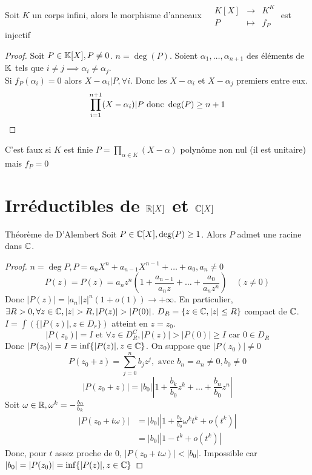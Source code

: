 \documentclass[]{report}
\begin{document}
    \begin{cor}{}{}
        Soit $K$ un corps infini, alors le morphisme d'anneaux $\begin{array}{ccccc}
    & K[X] & \to & K^K \\
    & P & \mapsto & f_P
    \end{array}$ est injectif
    \end{cor}

    \begin{proof}
        Soit $P\in\mathbb{K}[X],P\neq0$. $n=\deg(P)$. Soient $\alpha_1,\ldots,\alpha_{n+1}$ des éléments de $\mathbb{K}$ tels que $i\neq j\implies \alpha_i\neq \alpha_j$.\\
        Si $f_P(\alpha_i)=0$ alors $X-\alpha_i|P,\forall i$. Donc les $X-\alpha_i$ et $X-\alpha_j$ premiers entre eux.
        \[\prod_{i=1}^{n+1}(X-\alpha_i)|P\text{ donc }\deg(P)\ge n+1\]
    \end{proof}

    \begin{re}{}{}
        C'est faux si $K$ est finie $\displaystyle{P=\prod_{\alpha\in K}(X-\alpha)}$ polynôme non nul (il est unitaire) mais $f_P=0$
    \end{re}

    \section{Irréductibles de $\mathbb{R}[X]$ et $\mathbb{C}[X]$}

    \begin{tm}{Théorème de D'Alembert}{}
        Soit $P \in \mathbb{C}[X],\deg(P)\ge1$. Alors $P$ admet une racine dans $\mathbb{C}$.
    \end{tm}

    \begin{proof}
        $n=\deg P,P=a_n X^n+a_{n-1} X^{n-1}+\ldots+a_0,a_n\neq 0$
        \[P(z)=P(z)=a_n z^n(1+\frac{a_{n-1}}{a_n z}+\ldots+\frac{a_0}{a_n z^n})\quad (z\neq 0)\]
        Donc $|P(z)|=|a_n||z|^n(1+o(1))\to+\infty$. En particulier, $\exists R>0,\forall z\in\C,|z|>R,|P(z)|>|P(0)|$. $D_R=\{z\in\mathbb{C},|z|\le R\}$ compact de $\mathbb{C}$.\\
        $I=\int(\{|P(z)|,z\in D_r\})$ atteint en $z=z_0$.
        \[|P(z_0)|=I\text{ et }\forall z\in D_R^C,|P(z)|>|P(0)|\ge I\text{ car }0\in D_R\]
        Donc $|P(z_0)|=I=\inf \{|P(z)|,z\in\mathbb{C}\}$. On suppose que $|P(z_0)|\neq0$
        \[P(z_0+z)=\sum_{j=0}^{n} b_j z^j,\text{ avec }b_n=a_n\neq0,b_0\neq0\]
        \[|P(z_0+z)|=|b_0|\left| 1+\frac{b_k}{b_0}z^k+\ldots+\frac{b_n}{b_0} z^n \right|\]
        Soit $\omega\in\mathbb{R},\omega^k=-\frac{b_0}{b_k}$
        \begin{align*}
            |P(z_0+t\omega)|&=\left| b_0 \right|\left|1+\frac{b_k}{b_0}\omega^k t^k +o(t^k)\right|\\
            &=|b_0|\left|1-t^k+o(t^k)\right|
        \end{align*}
        Donc, pour $t$ assez proche de $0$, $|P(z_0+t\omega)|<|b_0|$. Impossible car $|b_0|=|P(z_0)|=\inf\{|P(z)|,z\in\mathbb{C}\}$
    \end{proof}
\end{document}
